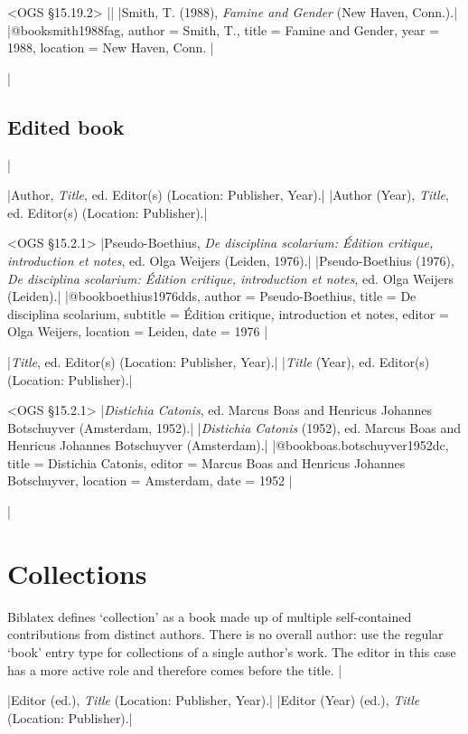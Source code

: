 \documentclass[extrafontsizes,11pt,a4paper,oneside]{memoir}
\newcommand*{\lit}[1]{\textsf{#1}}
\newcommand*{\code}[1]{`\textsf{#1}'}
\begin{document}
\bibexample<OGS \S15.19.2>
||%
|Smith, T. (1988), \emph{Famine and Gender} (New Haven, Conn.).|%
|@book{smith1988fag,
  author = {Smith, T.},
  title = {Famine and Gender},
  year = {1988},
  location = {New Haven, Conn.}
}|

\todoc|
\subsection{Edited book}
|

\specs
|Author, \emph{Title}, \lit{ed.} Editor(s) (Location: Publisher, Year).|%
|Author (Year), \emph{Title}, \lit{ed.} Editor(s) (Location: Publisher).|

\bibexample<OGS \S15.2.1>
|Pseudo-Boethius, \emph{De disciplina scolarium: Édition critique, introduction et notes}, ed. Olga Weijers (Leiden, 1976).|%
|Pseudo-Boethius (1976), \emph{De disciplina scolarium: Édition critique, introduction et notes}, ed. Olga Weijers (Leiden).|%
|@book{boethius1976dds,
  author = {Pseudo-Boethius},
  title = {De disciplina scolarium},
  subtitle = {Édition critique, introduction et notes},
  editor = {Olga Weijers},
  location = {Leiden},
  date = {1976}
}|

\specs
|\emph{Title}, \lit{ed.} Editor(s) (Location: Publisher, Year).|%
|\emph{Title} (Year), \lit{ed.} Editor(s) (Location: Publisher).|

\bibexample<OGS \S15.2.1>
|\emph{Distichia Catonis}, ed. Marcus Boas and Henricus Johannes Botschuyver (Amsterdam, 1952).|%
|\emph{Distichia Catonis} (1952), ed. Marcus Boas and Henricus Johannes Botschuyver (Amsterdam).|%
|@book{boas.botschuyver1952dc,
  title = {Distichia Catonis},
  editor = {Marcus Boas and Henricus Johannes Botschuyver},
  location = {Amsterdam},
  date = {1952}
}|

\todoc|
\section{Collections}

Biblatex defines \code{collection} as a book made up of multiple self-contained contributions from distinct authors. There is no overall author: use the regular \code{book} entry type for collections of a single author’s work. The editor in this case has a more active role and therefore comes before the title.
|

\specs
|Editor (\lit{ed.}), \emph{Title} (Location: Publisher, Year).|%
|Editor (Year) (\lit{ed.}), \emph{Title} (Location: Publisher).|
\end{document}
